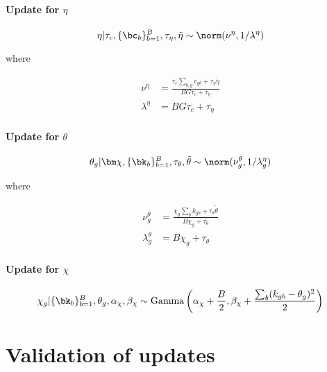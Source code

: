 \paragraph{Update for $\eta$}

\begin{equation}
  \eta | \tau_c, \{\bc_b\}_{b=1}^B, \tau_\eta, \tilde{\eta}
  \sim \norm(\nu^\eta, 1 / \lambda^\eta)
\end{equation}

where

\begin{equation}
  \begin{aligned}
    \nu^\eta & = \frac{\tau_c \sum_{b,g} c_{gb}  + \tau_\eta \tilde{\eta}}
    {BG\tau_c + \tau_\eta} \\
    \lambda^\eta & = BG\tau_c + \tau_\eta
  \end{aligned}
\end{equation}

\paragraph{Update for $\theta$}

\begin{equation}
  \theta_g | \bm \chi, \{\bk_b\}_{b=1}^B, \tau_\theta, \tilde{\theta}
  \sim \norm(\nu^\theta_g, 1 / \lambda^\eta_g)
\end{equation}

where

\begin{equation}
  \begin{aligned}
    \nu^\theta_g & = \frac{\chi_g \sum_{b} k_{gb}  + \tau_\theta \tilde{\theta}}
    {B \chi_g + \tau_\theta} \\
    \lambda^\theta_g & = B \chi_g + \tau_\theta
  \end{aligned}
\end{equation}

\paragraph{Update for $\chi$}

\begin{equation}
  \chi_g | \{\bk_b\}_{b=1}^B, \theta_g, \alpha_\chi, \beta_\chi
  \sim \text{Gamma} \left(
  \alpha_\chi + \frac{B}{2}, \beta_\chi + \frac{\sum_b (k_{gb} - \theta_g)^2}{2}
  \right)
\end{equation}


\section{Validation of updates}

